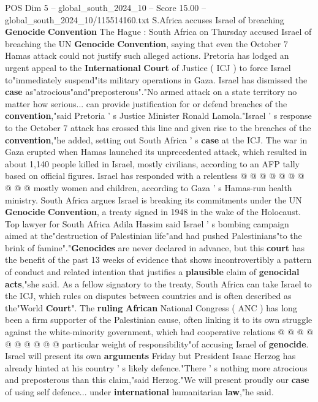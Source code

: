 \begin{textsample}{POS Dim 5 – global\_south\_2024\_10 – Score 15.00 – global\_south\_2024\_10/115514160.txt}  \label{ex:f5_pos_326}
S.Africa accuses Israel of breaching \textbf{Genocide} \textbf{Convention} The Hague : South Africa on Thursday accused Israel of breaching the UN \textbf{Genocide} \textbf{Convention}, saying that even the October 7 Hamas attack could not justify such alleged actions.
Pretoria has lodged an urgent appeal to the \textbf{International} \textbf{Court} of Justice ( ICJ ) to force Israel to"immediately suspend"its military operations in Gaza.
Israel has dismissed the \textbf{case} as"atrocious"and"preposterous"."No armed attack on a state territory no matter how serious... can provide justification for or defend breaches of the \textbf{convention},"said Pretoria ' s Justice Minister Ronald Lamola."Israel ' s response to the October 7 attack has crossed this line and given rise to the breaches of the \textbf{convention},"he added, setting out South Africa ' s \textbf{case} at the ICJ.
The war in Gaza erupted when Hamas launched its unprecedented attack, which resulted in about 1,140 people killed in Israel, mostly civilians, according to an AFP tally based on official figures.
Israel has responded with a relentless @ @ @ @ @ @ @ @ @ @ mostly women and children, according to Gaza ' s Hamas-run health ministry.
South Africa argues Israel is breaking its commitments under the UN \textbf{Genocide} \textbf{Convention}, a treaty signed in 1948 in the wake of the Holocaust.
Top lawyer for South Africa Adila Hassim said Israel ' s bombing campaign aimed at the"destruction of Palestinian life"and had pushed Palestinians"to the brink of famine"."\textbf{Genocides} are never declared in advance, but this \textbf{court} has the benefit of the past 13 weeks of evidence that shows incontrovertibly a pattern of conduct and related intention that justifies a \textbf{plausible} claim of \textbf{genocidal} \textbf{acts},"she said.
As a fellow signatory to the treaty, South Africa can take Israel to the ICJ, which rules on disputes between countries and is often described as the"World \textbf{Court}".
The \textbf{ruling} \textbf{African} National Congress ( ANC ) has long been a firm supporter of the Palestinian cause, often linking it to its own struggle against the white-minority government, which had cooperative relations @ @ @ @ @ @ @ @ @ @ particular weight of responsibility"of accusing Israel of \textbf{genocide}.
Israel will present its own \textbf{arguments} Friday but President Isaac Herzog has already hinted at his country ' s likely defence."There ' s nothing more atrocious and preposterous than this claim,"said Herzog."We will present proudly our \textbf{case} of using self defence... under \textbf{international} humanitarian \textbf{law},"he said.

\end{textsample}
